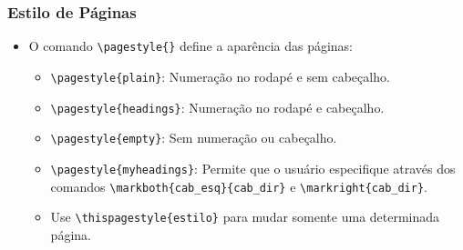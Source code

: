 \begin{frame}[fragile]
\frametitle{Estilo de Páginas}


\begin{itemize}
  \item O comando \verb|\pagestyle{}| define a aparência das páginas:
  \begin{itemize}
    \item \verb|\pagestyle{plain}|: Numeração no rodapé e sem cabeçalho.
    \item \verb|\pagestyle{headings}|: Numeração no rodapé e cabeçalho.
    \item \verb|\pagestyle{empty}|: Sem numeração ou cabeçalho.
    \item \verb|\pagestyle{myheadings}|: Permite que o usuário especifique através dos comandos
    \verb|\markboth{cab_esq}{cab_dir}| e \verb|\markright{cab_dir}|.
    \item Use \verb|\thispagestyle{estilo}| para mudar somente uma determinada página.
  \end{itemize}
\end{itemize}
 
\end{frame}

